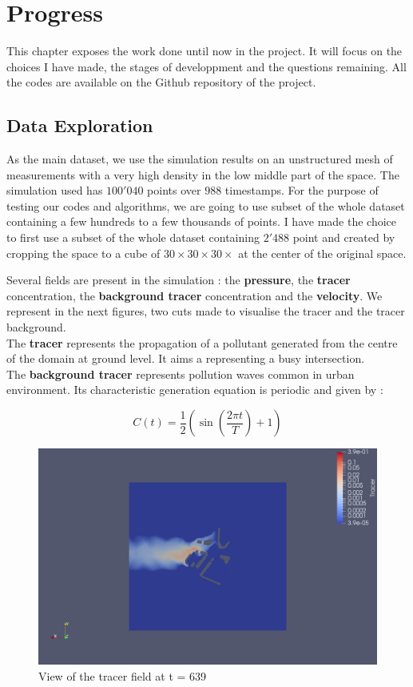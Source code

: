 \chapter{Progress}

This chapter exposes the work done until now in the project. It will focus on the choices I have made, the stages of developpment and the questions remaining. All the codes are available on the Github repository of the project.


\section{Data Exploration}

As the main dataset, we use the simulation results on an unstructured mesh of measurements with a very high density in the low middle part of the space. The simulation used has $100'040$ points over $988$ timestamps. For the purpose of testing our codes and algorithms,  we are going to use subset of the whole dataset containing a few hundreds to a few thousands of points. I have made the choice to first use a subset of the whole dataset containing $2'488$ point and created by cropping the space to a cube of $30\times30\times30\times$ at the center of the original space. 


 Several fields are present in the simulation : the \textbf{pressure}, the \textbf{tracer} concentration, the \textbf{background tracer} concentration and the \textbf{velocity}. We represent in the next figures, two cuts made to visualise the tracer and the tracer background. \\ 

The \textbf{tracer} represents the propagation of a pollutant generated from the centre of the domain at ground level. It aims a representing a busy intersection. \\

The \textbf{background tracer} represents pollution waves common in urban environment. Its characteristic generation equation is periodic and given by : 

\begin{equation}
	C(t)= \frac{1}{2} \left( \sin \left( \frac{2\pi t}{T} \right) + 1 \right)
\end{equation}

\begin{figure}[h!]
\centering
  \includegraphics[width=0.8\linewidth]{figures/Tracer/tracer_cut_z_639}
  \caption{View of the tracer field at t = 639 }
  \label{fig:view:tracer}
\end{figure}

